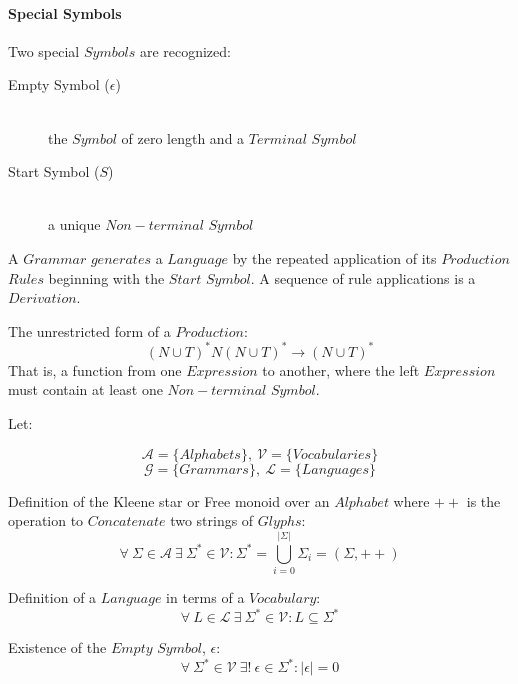 \documentclass{article}
\begin{document}
\paragraph{Special Symbols}

Two special $Symbols$ are recognized:

    \begin{description}

    \item[Empty Symbol ($\epsilon$)] \hfill \\
    the $Symbol$ of zero length and a $Terminal$ $Symbol$

    \item[Start Symbol ($S$)] \hfill \\
    a unique $Non-terminal$ $Symbol$

    \end{description}

A $Grammar$ $generates$ a $Language$ by the repeated application
of its $Production$ $Rules$ beginning with the $Start$ $Symbol$. A
sequence of rule applications is a $Derivation$.

The unrestricted form of a $Production$:
\[
    (N \cup T)^*N(N \cup T)^* \rightarrow (N \cup T)^*
\]
That is, a function from one $Expression$ to another, where the left
$Expression$ must contain at least one $Non-terminal$ $Symbol$.

Let:

\[
    \mathcal{A} = \{ Alphabets \},\: \mathcal{V} = \{ Vocabularies \}
\] \[
    \mathcal{G} = \{ Grammars \},\: \mathcal{L} = \{ Languages \}
\]

    \begin{description}

    \item Definition of the Kleene star or Free monoid over an
      $Alphabet$ where $++$ is the operation to $Concatenate$ two
      strings of $Glyphs$:
    \[
        \forall \: \Sigma \in \mathcal{A} \:
        \exists \: \Sigma^* \in \mathcal{V}
        : \Sigma^* = \bigcup_{i=0}^{|\Sigma|} \Sigma_i
        = (\Sigma,++)
    \]

    \item Definition of a $Language$ in terms of a $Vocabulary$:
    \[
        \forall \: L \in \mathcal{L} \:
        \exists \: \Sigma^* \in \mathcal{V}
        : L \subseteq \Sigma^*
    \]

    \item Existence of the $Empty$ $Symbol$, $\epsilon$:
    \[
        \forall \: \Sigma^* \in \mathcal{V} \:
        \exists ! \: \epsilon \in \Sigma^*
        : |\epsilon|=0
    \]

    \end{description}
\end{document}
